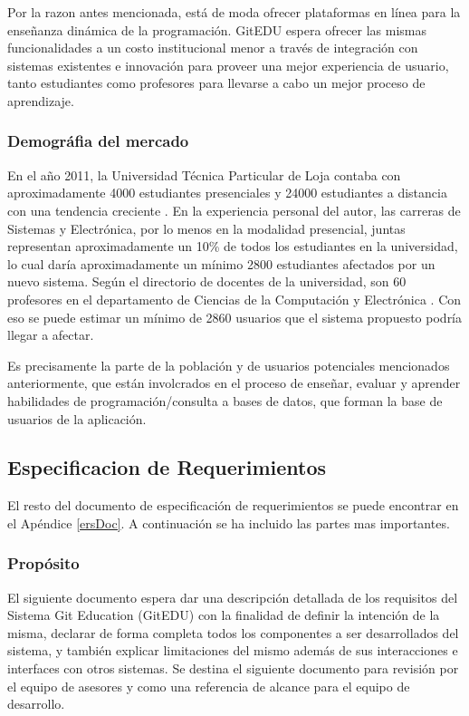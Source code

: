 Por la razon antes mencionada, está de moda ofrecer plataformas en línea para la enseñanza dinámica de la programación. GitEDU espera ofrecer las mismas funcionalidades a un costo institucional menor a través de integración con sistemas existentes e innovación para proveer una mejor experiencia de usuario, tanto estudiantes como profesores para llevarse a cabo un mejor proceso de aprendizaje.

\subsubsection{Demográfia del mercado}
En el año 2011, la Universidad Técnica Particular de Loja contaba con aproximadamente 4000 estudiantes presenciales y 24000 estudiantes a distancia con una tendencia creciente \citep{UTPL-Datos-Estadisticos}. En la experiencia personal del autor, las carreras de Sistemas y Electrónica, por lo menos en la modalidad presencial, juntas representan aproximadamente un 10\% de todos los estudiantes en la universidad, lo cual daría aproximadamente un mínimo 2800 estudiantes afectados por un nuevo sistema. Según el directorio de docentes de la universidad, son 60 profesores en el departamento de Ciencias de la Computación y Electrónica \citep{UTPL-Directorio-Docentes}. Con eso se puede estimar un mínimo de 2860 usuarios que el sistema propuesto podría llegar a afectar.

Es precisamente la parte de la población y de usuarios potenciales mencionados anteriormente, que están involcrados en el proceso de enseñar, evaluar y aprender habilidades de programación/consulta a bases de datos, que forman la base de usuarios de la aplicación.

\subsection{Especificacion de Requerimientos}
El resto del documento de especificación de requerimientos se puede encontrar en el Apéndice \ref{ersDoc}. A continuación se ha incluido las partes mas importantes.

\subsubsection{Propósito}
El siguiente documento espera dar una descripción detallada de los requisitos del Sistema Git Education (GitEDU) con la finalidad de definir la intención de la misma, declarar de forma completa todos los componentes a ser desarrollados del sistema, y también explicar limitaciones del mismo además de sus interacciones e interfaces con otros sistemas. Se destina el siguiente documento para revisión por el equipo de asesores y como una referencia de alcance para el equipo de desarrollo.

